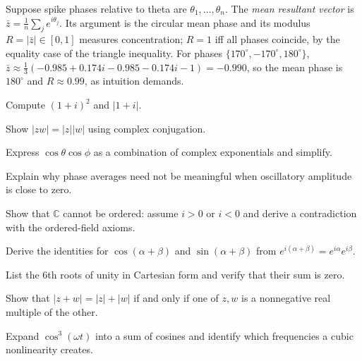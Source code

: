 \begin{workedexample}
Suppose spike phases relative to theta are $\theta_1,\ldots,\theta_n$. The \emph{mean resultant vector} is $\bar z=\frac1n\sum_je^{i\theta_j}$. Its argument is the circular mean phase and its modulus $R=|\bar z|\in[0,1]$ measures concentration; $R=1$ iff all phases coincide, by the equality case of the triangle inequality. For phases $\{170^\circ,-170^\circ,180^\circ\}$, $\bar z\approx\frac13(-0.985+0.174i-0.985-0.174i-1)=-0.990$, so the mean phase is $180^\circ$ and $R\approx0.99$, as intuition demands.
\end{workedexample}
\begin{exercises}
\item Compute $(1+i)^2$ and $|1+i|$.
\item Show $|zw|=|z||w|$ using complex conjugation.
\item Express $\cos\theta\cos\phi$ as a combination of complex exponentials and simplify.
\item Explain why phase averages need not be meaningful when oscillatory amplitude is close to zero.
\item Show that $\mathbb C$ cannot be ordered: assume $i>0$ or $i<0$ and derive a contradiction with the ordered-field axioms.
\item Derive the identities for $\cos(\alpha+\beta)$ and $\sin(\alpha+\beta)$ from $e^{i(\alpha+\beta)}=e^{i\alpha}e^{i\beta}$.
\item List the 6th roots of unity in Cartesian form and verify that their sum is zero.
\item Show that $|z+w|=|z|+|w|$ if and only if one of $z,w$ is a nonnegative real multiple of the other.
\item Expand $\cos^3(\omega t)$ into a sum of cosines and identify which frequencies a cubic nonlinearity creates.
\end{exercises}
